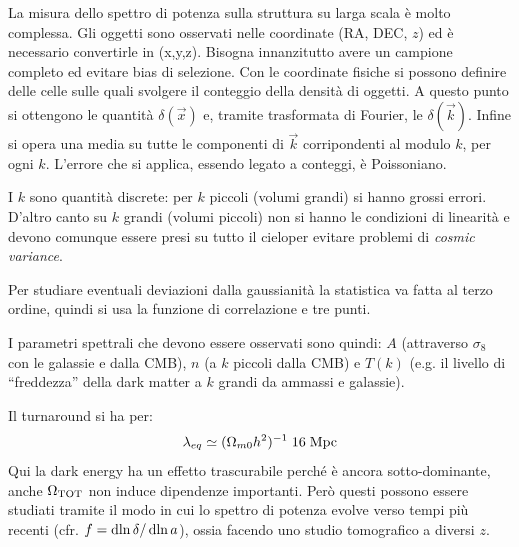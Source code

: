 La misura dello spettro di potenza sulla struttura su larga scala è molto complessa. Gli oggetti sono osservati nelle coordinate (RA, DEC, $z$) ed è necessario convertirle in (x,y,z). Bisogna innanzitutto avere un campione completo ed evitare bias di selezione. Con le coordinate fisiche si possono definire delle celle sulle quali svolgere il conteggio della densità di oggetti. A questo punto si ottengono le quantità $\delta (\vec{x})$ e, tramite trasformata di Fourier, le $\delta (\vec{k})$. Infine si opera una media su tutte le componenti di $\vec{k}$ corripondenti al modulo $k$, per ogni $k$. L'errore che si applica, essendo legato a conteggi, è Poissoniano.

I $k$ sono quantità discrete: per $k$ piccoli (volumi grandi) si hanno grossi errori. D'altro canto su $k$ grandi (volumi piccoli) non si hanno le condizioni di linearità e devono comunque essere presi su tutto il cieloper evitare problemi di \textit{cosmic variance}.

Per studiare eventuali deviazioni dalla gaussianità la statistica va fatta al terzo ordine, quindi si usa la funzione di correlazione e tre punti.

I parametri spettrali che devono essere osservati sono quindi: $A$ (attraverso $\sigma_8$ con le galassie e dalla CMB), $n$ (a $k$ piccoli dalla CMB) e $T(k)$ (e.g. il livello di ``freddezza'' della dark matter a $k$ grandi da ammassi e galassie).

Il turnaround si ha per:
$$ \lambda_{eq}\simeq (\Omega_{m0} h^2)^{-1} \; 16\; \mathrm{Mpc} $$
Qui la dark energy ha un effetto trascurabile perché è ancora sotto-dominante, anche $\Omega_{\mathrm{TOT}}$ non induce dipendenze importanti. Però questi possono essere studiati tramite il modo in cui lo spettro di potenza evolve verso tempi più recenti (cfr. $f=\operatorname{d}\!{\ln\delta}/\operatorname{d}\!{\ln a}$), ossia facendo uno studio tomografico a diversi $z$.




